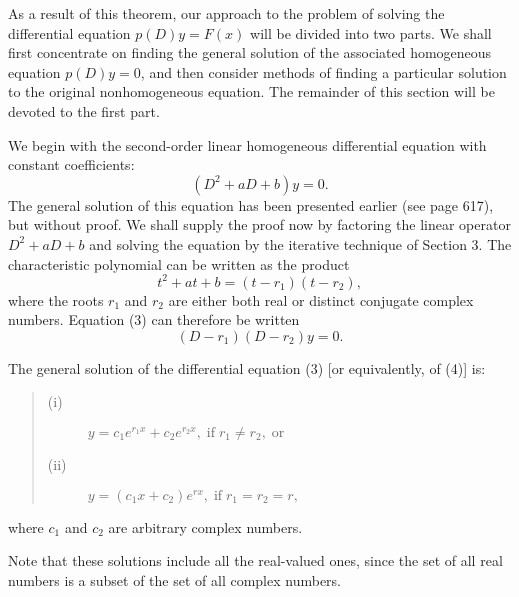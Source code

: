 As a result of this theorem, our approach to the problem of solving the differential equation $p(D)y = F(x)$ will be divided into two parts. We shall first concentrate on finding the general solution of the associated homogeneous equation $p(D)y = 0$, and then consider methods of finding a particular solution to the original nonhomogeneous equation. The remainder of this section will be devoted to the first part.

We begin with the second-order linear homogeneous differential equation with constant coefficients:
\begin{equation}
(D^2 + aD + b)y = 0. 
\label{eq11.4.3}
\end{equation}
The general solution of this equation has been presented earlier (see page 617), but without proof. We shall supply the proof now by factoring the linear operator $D^2 + aD + b$ and solving the equation by the iterative technique of Section 3. The characteristic polynomial can be written as the product
$$
t^2 + at + b = (t - r_1)(t - r_2),
$$
where the roots $r_1$ and $r_2$ are either both real or distinct conjugate complex numbers. Equation (3) can therefore be written
\begin{equation}
(D - r_1)(D - r_2)y = 0. 
\label{eq11.4.4}
\end{equation}

\begin{theorem}
The general solution of the differential equation (3) [or equivalently, of (4)] is:
 
\begin{quote}
\begin{description}
\item[(i)] $y = c_1e^{r_1x} + c_2e^{r_2x}, \;\mbox{if}\; r_1 \neq r_2, \;\mbox{or}$
\item[(ii)] $y = (c_1x + c_2)e^{rx},  \;\mbox{if}\; r_1 = r_2 = r,$ 
\end{description}

\end{quote} 
\noindent where $c_1$ and $c_2$ are arbitrary complex numbers.
\end{theorem}

Note that these solutions include all the real-valued ones, since the set of all real numbers is a subset of the set of all complex numbers.

